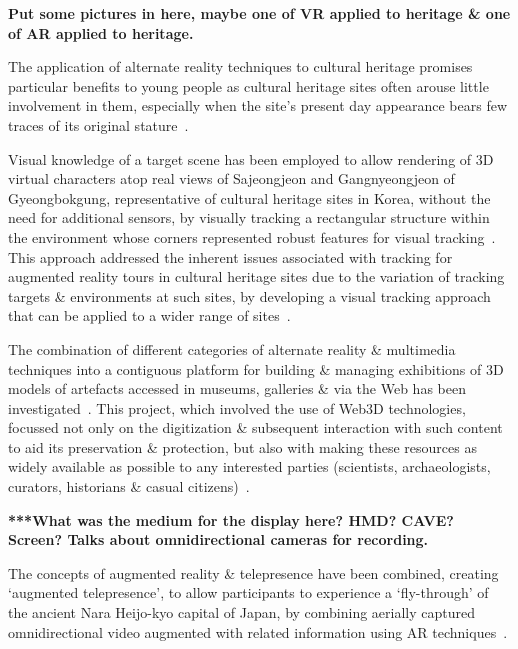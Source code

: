 \textbf{Put some pictures in here, maybe one of VR applied to heritage \& one of AR applied to heritage.}

\clearpage


The application of alternate reality techniques to cultural heritage promises particular benefits to young people as cultural heritage sites often arouse little involvement in them, especially when the site's present day appearance bears few traces of its original stature~\cite{ardito:combining}.


Visual knowledge of a target scene has been employed to allow rendering of 3D virtual characters atop real views of Sajeongjeon and Gangnyeongjeon of Gyeongbokgung, representative of cultural heritage sites in Korea, without the need for additional sensors, by visually tracking a rectangular structure within the environment whose corners represented robust features for visual tracking~\cite{Kim2009,}. This approach addressed the inherent issues associated with tracking for augmented reality tours in cultural heritage sites due to the variation of tracking targets \& environments at such sites, by developing a visual tracking approach that can be applied to a wider range of sites~\cite{Seo2010}.


The combination of different categories of alternate reality \& multimedia techniques into a contiguous platform for building \& managing exhibitions of 3D models of artefacts accessed in museums, galleries \& via the Web has been investigated~\cite{Wojciechowski2004}. This project, which involved the use of Web3D technologies, focussed not only on the digitization \& subsequent interaction with such content to aid its preservation \& protection, but also with making these resources as widely available as possible to any interested parties (scientists, archaeologists, curators, historians \& casual citizens)~\cite{walczak:applications}.


\textbf{***What was the medium for the display here? HMD? CAVE? Screen? Talks about omnidirectional cameras for recording.}

The concepts of augmented reality \& telepresence have been combined, creating `augmented telepresence', to allow participants to experience a `fly-through' of the ancient Nara Heijo-kyo capital of Japan, by combining aerially captured omnidirectional video augmented with related information using AR techniques~\cite{Okura2006,Okura2011}.

